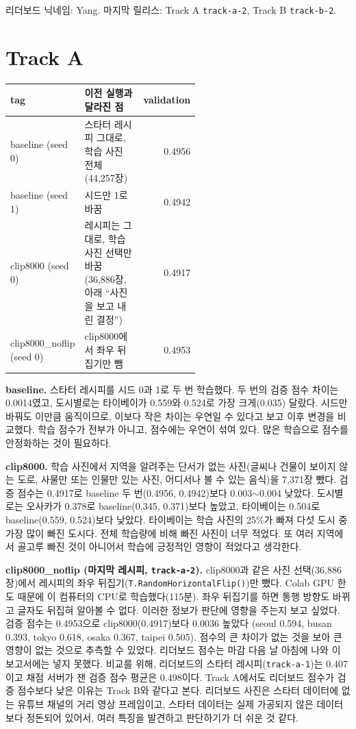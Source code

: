 \documentclass[11pt]{article}
\begin{document}
\makeheader

리더보드 닉네임: Yang.
마지막 릴리스: Track A \texttt{track-a-2}, Track B \texttt{track-b-2}.

\section*{Track A}

\begin{center}\footnotesize
\begin{tabular}{lp{0.55\linewidth}r}
\toprule
tag & 이전 실행과 달라진 점 & validation \\
\midrule
baseline (seed 0) & 스타터 레시피 그대로, 학습 사진 전체 (44,257장) & 0.4956 \\
baseline (seed 1) & 시드만 1로 바꿈 & 0.4942 \\
clip8000 (seed 0) & 레시피는 그대로, 학습 사진 선택만 바꿈 (36,886장, 아래 ``사진을 보고 내린 결정'') & 0.4917 \\
clip8000\_noflip (seed 0) & clip8000에서 좌우 뒤집기만 뺌 & 0.4953 \\
\bottomrule
\end{tabular}
\end{center}

\textbf{baseline.} 스타터 레시피를 시드 0과 1로 두 번 학습했다. 두 번의 검증 점수 차이는
0.0014였고, 도시별로는 타이베이가 0.559와 0.524로 가장 크게(0.035) 달랐다. 시드만 바꿔도
이만큼 움직이므로, 이보다 작은 차이는 우연일 수 있다고 보고 이후 변경을 비교했다.
학습 점수가 전부가 아니고, 점수에는 우연이 섞여 있다. 많은 학습으로 점수를 안정화하는 것이 필요하다.

\textbf{clip8000.} 학습 사진에서 지역을 알려주는 단서가 없는 사진(글씨나 건물이 보이지
않는 도로, 사물만 또는 인물만 있는 사진, 어디서나 볼 수 있는 음식)을 7,371장 뺐다.
검증 점수는 0.4917로 baseline 두 번(0.4956, 0.4942)보다 0.003$\sim$0.004 낮았다.
도시별로는 오사카가 0.378로 baseline(0.345, 0.371)보다 높았고, 타이베이는 0.504로
baseline(0.559, 0.524)보다 낮았다. 타이베이는 학습 사진의 25\%가 빠져 다섯 도시 중 가장
많이 빠진 도시다. 전체 학습량에 비해 빠진 사진이 너무 적었다. 또 여러 지역에서 골고루 빠진 것이 아니어서 학습에 긍정적인 영향이 적었다고 생각한다.

\textbf{clip8000\_noflip (마지막 레시피, \texttt{track-a-2}).} clip8000과 같은 사진 선택(36,886장)에서
레시피의 좌우 뒤집기(\texttt{T.RandomHorizontalFlip()})만 뺐다. Colab GPU 한도 때문에 이 컴퓨터의
CPU로 학습했다(115분). 좌우 뒤집기를 하면 통행 방향도 바뀌고 글자도 뒤집혀 알아볼 수 없다.
이러한 정보가 판단에 영향을 주는지 보고 싶었다. 검증 점수는 0.4953으로 clip8000(0.4917)보다
0.0036 높았다 (seoul 0.594, busan 0.393, tokyo 0.618, osaka 0.367, taipei 0.505).
점수의 큰 차이가 없는 것을 보아 큰 영향이 없는 것으로 추측할 수 있었다.
리더보드 점수는 마감 다음 날 아침에 나와 이 보고서에는 넣지 못했다. 비교를 위해, 리더보드의
스타터 레시피(\texttt{track-a-1})는 0.407이고 채점 서버가 잰 검증 점수 평균은 0.498이다.
Track A에서도 리더보드 점수가 검증 점수보다 낮은 이유는 Track B와 같다고 본다. 리더보드 사진은
스타터 데이터에 없는 유튜브 채널의 거리 영상 프레임이고, 스타터 데이터는 실제 가공되지 않은
데이터보다 정돈되어 있어서, 여러 특징을 발견하고 판단하기가 더 쉬운 것 같다.
\end{document}
